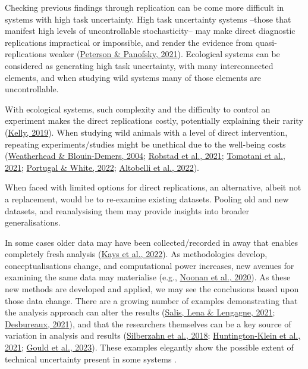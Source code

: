 \documentclass[10pt,a4paper]{article}
\begin{document}
Checking previous findings through replication can be come more difficult in systems with high task uncertainty.
High task uncertainty systems --those that manifest high levels of uncontrollable stochasticity-- may make direct diagnostic replications impractical or impossible, and render the evidence from quasi-replications weaker (\protect\hyperlink{ref-peterson_self-correction_2021}{Peterson \& Panofsky, 2021}).
Ecological systems can be considered as generating high task uncertainty, with many interconnected elements, and when studying wild systems many of those elements are uncontrollable.

With ecological systems, such complexity and the difficulty to control an experiment makes the direct replications costly, potentially explaining their rarity (\protect\hyperlink{ref-kelly_rate_2019}{Kelly, 2019}).
When studying wild animals with a level of direct intervention, repeating experiments/studies might be unethical due to the well-being costs (\protect\hyperlink{ref-Weatherhead2004}{Weatherhead \& Blouin-Demers, 2004}; \protect\hyperlink{ref-robstad_impact_2021}{Robstad et al., 2021}; \protect\hyperlink{ref-tomotani_great_2021}{Tomotani et al., 2021}; \protect\hyperlink{ref-portugal_externally_2022}{Portugal \& White, 2022}; \protect\hyperlink{ref-altobelli_methods_2022}{Altobelli et al., 2022}).

When faced with limited options for direct replications, an alternative, albeit not a replacement, would be to re-examine existing datasets.
Pooling old and new datasets, and reanalysising them may provide insights into broader generalisations.

In some cases older data may have been collected/recorded in away that enables completely fresh analysis (\protect\hyperlink{ref-kays_movebank_2022}{Kays et al., 2022}).
As methodologies develop, conceptualisations change, and computational power increases, new avenues for examining the same data may materialise (e.g., \protect\hyperlink{ref-noonan_effects_2020}{Noonan et al., 2020}).
As these new methods are developed and applied, we may see the conclusions based upon those data change.
There are a growing number of examples demonstrating that the analysis approach can alter the results (\protect\hyperlink{ref-salis_how_2021}{Salis, Lena \& Lengagne, 2021}; \protect\hyperlink{ref-desbureaux_subjective_2021}{Desbureaux, 2021}), and that the researchers themselves can be a key source of variation in analysis and results (\protect\hyperlink{ref-silberzahn_many_2018}{Silberzahn et al., 2018}; \protect\hyperlink{ref-huntingtonklein_influence_2021}{Huntington‐Klein et al., 2021}; \protect\hyperlink{ref-gould_same_2023}{Gould et al., 2023}).
These examples elegantly show the possible extent of technical uncertainty present in some systems .
\end{document}
